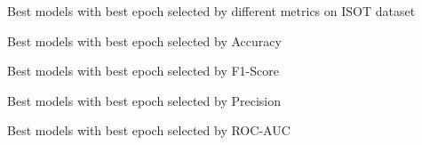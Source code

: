 \begin{table}[!htbp]
    \caption{Best models with best epoch selected by different metrics on ISOT dataset}
    \label{tab:isot_best_models}
    \centering

    \begin{subtable}[t]{\linewidth}
        \footnotesize
        \caption{Best models with best epoch selected by Accuracy}
        
    \end{subtable}

    \vspace{1em}

    \begin{subtable}[t]{\linewidth}
        \footnotesize
        \caption{Best models with best epoch selected by F1-Score}
        
    \end{subtable}

    \vspace{1em}

    \begin{subtable}[t]{\linewidth}
        \footnotesize
        \caption{Best models with best epoch selected by Precision}
        
    \end{subtable}


    \vspace{1em}

    \begin{subtable}[t]{\linewidth}
        \footnotesize
        \caption{Best models with best epoch selected by ROC-AUC}
        
    \end{subtable}



\end{table}